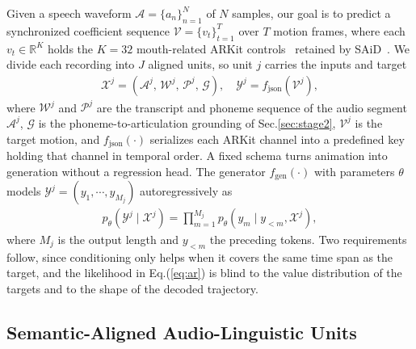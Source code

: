 Given a speech waveform $\mathcal{A}\!=\!\{a_{n}\}_{n=1}^{N}$ of $N$ samples, our goal is to predict a synchronized coefficient sequence $\mathcal{V}\!=\!\{v_{t}\}_{t=1}^{T}$ over $T$ motion frames, where each $v_{t}\!\in\!\mathbb{R}^{K}$ holds the $K\!=\!32$ mouth-related ARKit controls~\citep{apple_arkit} retained by SAiD~\citep{park2023said}. We divide each recording into $J$ aligned units, so unit $j$ carries the inputs and target
\begin{gather}
    \mathcal{X}^{j}=\left(\mathcal{A}^{j},\,\mathcal{W}^{j},\,\mathcal{P}^{j},\,\mathcal{G}\right),\quad
    \mathcal{Y}^{j}=f_{\mathrm{json}}\!\left(\mathcal{V}^{j}\right), \label{eq:unit}
\end{gather}
where $\mathcal{W}^{j}$ and $\mathcal{P}^{j}$ are the transcript and phoneme sequence of the audio segment $\mathcal{A}^{j}$, $\mathcal{G}$ is the phoneme-to-articulation grounding of Sec.\ref{sec:stage2}, $\mathcal{V}^{j}$ is the target motion, and $f_{\mathrm{json}}(\cdot)$ serializes each ARKit channel into a predefined key holding that channel in temporal order. A fixed schema turns animation into generation without a regression head. The generator $f_{\mathrm{gen}}(\cdot)$ with parameters $\theta$ models $\mathcal{Y}^{j}\!=\!(y_{1},\cdots,y_{M_{j}})$ autoregressively as
\begin{gather}
    p_{\theta}\!\left(\mathcal{Y}^{j}\mid\mathcal{X}^{j}\right)=\prod_{m=1}^{M_{j}}p_{\theta}\!\left(y_{m}\mid y_{<m},\mathcal{X}^{j}\right), \label{eq:ar}
\end{gather}
where $M_{j}$ is the output length and $y_{<m}$ the preceding tokens. Two requirements follow, since conditioning only helps when it covers the same time span as the target, and the likelihood in Eq.(\ref{eq:ar}) is blind to the value distribution of the targets and to the shape of the decoded trajectory.

\subsection{Semantic-Aligned Audio-Linguistic Units}
\label{sec:stage1}

